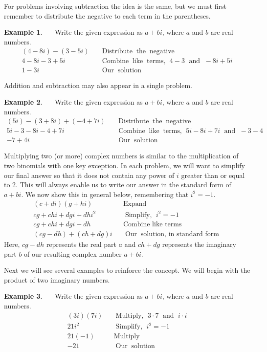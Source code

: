 \documentclass[12pt]{book}
\theoremstyle{definition}
\newtheorem{example}{Example}
\newcommand{\tmop}[1]{\ensuremath{\operatorname{#1}}}
\begin{document}
For problems involving subtraction the idea is the same, but we must first remember to distribute the negative to each term in the parentheses.
\begin{example}~~~Write the given expression as $a+bi$, where $a$ and $b$ are real numbers.
  \begin{eqnarray*}
    (4 - 8 i) - (3 - 5 i) &  & \tmop{Distribute} \tmop{the} \tmop{negative}\\
    4 - 8 i - 3 + 5 i &  & \tmop{Combine} \tmop{like} \tmop{terms,~} 4 - 3
    \tmop{~and~} - 8 i + 5 i\\
    1 - 3 i &  & \tmop{Our} \tmop{solution}
  \end{eqnarray*}
\end{example}
Addition and subtraction may also appear in a single problem.
\begin{example}~~~Write the given expression as $a+bi$, where $a$ and $b$ are real numbers.
  \begin{eqnarray*}
    (5 i) - (3 + 8 i) + (- 4 + 7 i) &  & \tmop{Distribute} \tmop{the}
    \tmop{negative}\\
    5 i - 3 - 8 i - 4 + 7 i &  & \tmop{Combine} \tmop{like} \tmop{terms,~} 5 i -
    8 i + 7 i \tmop{~and~} - 3 - 4\\
    - 7 + 4 i &  & \tmop{Our} \tmop{solution}
  \end{eqnarray*}
\end{example}
Multiplying two (or more) complex numbers is similar to the multiplication of two binomials with one key exception.  In each problem, we will want to simplify our final answer so that it does not contain any power of $i$ greater than or equal to 2.  This will always enable us to write our answer in the standard form of $a+bi$.  We now show this in general below, remembering that $i^2=-1$.
\begin{eqnarray*}
    (c+di)(g+hi) &  & \tmop{Expand}\\
    cg+chi+dgi+dhi^2 &  & \tmop{Simplify,~} i^2=-1\\
    cg+chi+dgi-dh~~ &  & \tmop{Combine~like~terms}\\
    (cg-dh)+(ch+dg)i &  & \tmop{Our} \tmop{solution,~in~standard~form}
\end{eqnarray*}
Here, $cg-dh$ represents the real part $a$ and $ch+dg$ represents the imaginary part $b$ of our resulting complex number $a+bi$.\par
Next we will see several examples to reinforce the concept.  We will begin with the product of two imaginary numbers.
\begin{example}~~~Write the given expression as $a+bi$, where $a$ and $b$ are real numbers.
  \begin{eqnarray*}
    (3 i) (7 i) &  & \tmop{Multiply,~} 3\cdot 7 \tmop{~and~} i\cdot i\\
    21 i^2 &  & \tmop{Simplify,~} i^2 = - 1\\
    21 (- 1) &  & \tmop{Multiply}\\
    - 21 &  & \tmop{Our} \tmop{solution}
  \end{eqnarray*}
\end{example}
\end{document}
